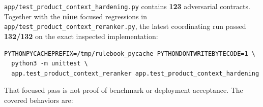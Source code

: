 \texttt{app/test\_\allowbreak{}product\_\allowbreak{}context\_\allowbreak{}hardening.py} contains \textbf{123} adversarial contracts. Together with the \textbf{nine} focused regressions in \texttt{app/test\_\allowbreak{}product\_\allowbreak{}context\_\allowbreak{}reranker.py}, the latest coordinating run passed \textbf{132/132} on the exact inspected implementation:

\begin{verbatim}
PYTHONPYCACHEPREFIX=/tmp/rulebook_pycache PYTHONDONTWRITEBYTECODE=1 \
  python3 -m unittest \
  app.test_product_context_reranker app.test_product_context_hardening
\end{verbatim}

That focused pass is not proof of benchmark or deployment acceptance. The covered behaviors are:

